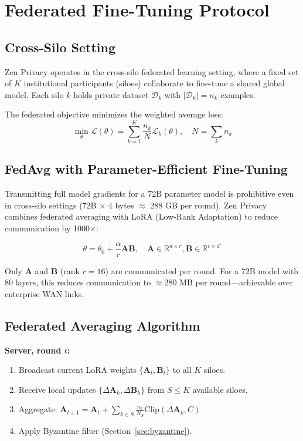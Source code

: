 \documentclass[11pt,a4paper]{article}
\begin{document}
\section{Federated Fine-Tuning Protocol}

\subsection{Cross-Silo Setting}

Zen Privacy operates in the cross-silo federated learning setting, where a fixed set of $K$ institutional participants (siloes) collaborate to fine-tune a shared global model. Each silo $k$ holds private dataset $\mathcal{D}_k$ with $|\mathcal{D}_k| = n_k$ examples.

The federated objective minimizes the weighted average loss:
\begin{equation}
\min_\theta \mathcal{L}(\theta) = \sum_{k=1}^K \frac{n_k}{N} \mathcal{L}_k(\theta), \quad N = \sum_k n_k
\end{equation}

\subsection{FedAvg with Parameter-Efficient Fine-Tuning}

Transmitting full model gradients for a 72B parameter model is prohibitive even in cross-silo settings (72B $\times$ 4 bytes $\approx$ 288 GB per round). Zen Privacy combines federated averaging with LoRA (Low-Rank Adaptation) to reduce communication by 1000$\times$:

\begin{equation}
\theta = \theta_0 + \frac{\alpha}{r} \mathbf{A}\mathbf{B}, \quad \mathbf{A} \in \mathbb{R}^{d \times r}, \mathbf{B} \in \mathbb{R}^{r \times d'}
\end{equation}

Only $\mathbf{A}$ and $\mathbf{B}$ (rank $r=16$) are communicated per round. For a 72B model with 80 layers, this reduces communication to $\approx$280 MB per round—achievable over enterprise WAN links.

\subsection{Federated Averaging Algorithm}

\textbf{Server, round $t$:}
\begin{enumerate}
  \item Broadcast current LoRA weights $\{\mathbf{A}_t, \mathbf{B}_t\}$ to all $K$ siloes.
  \item Receive local updates $\{\Delta\mathbf{A}_k, \Delta\mathbf{B}_k\}$ from $S \leq K$ available siloes.
  \item Aggregate: $\mathbf{A}_{t+1} = \mathbf{A}_t + \sum_{k \in S} \frac{n_k}{N_S} \text{Clip}(\Delta\mathbf{A}_k, C)$
  \item Apply Byzantine filter (Section~\ref{sec:byzantine}).
\end{enumerate}
\end{document}
